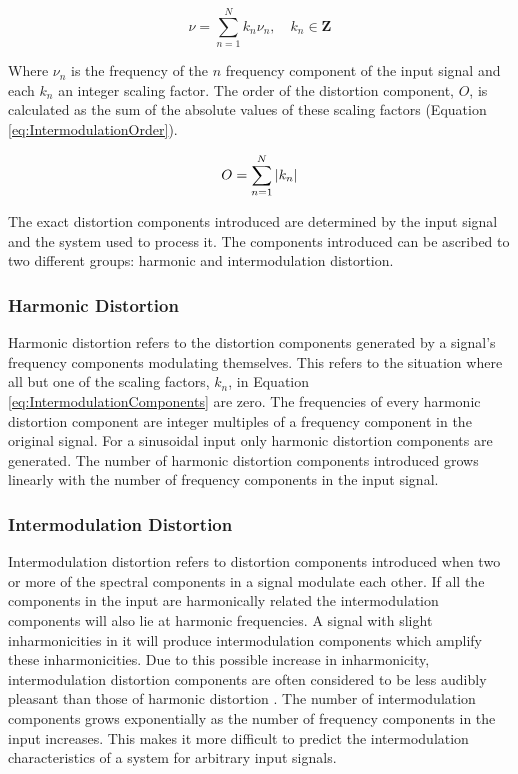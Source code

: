 		\begin{equation}
			\nu = \sum_{n = 1}^{N} k_{n}\nu_{n}, \quad k_{n} \in \textbf{Z}
			\label{eq:IntermodulationComponents}
		\end{equation}

		Where $\nu_{n}$ is the frequency of the $n$ frequency component of the input signal and each
		$k_{n}$ an integer scaling factor. The order of the distortion component, $O$, is calculated as the sum of
		the absolute values of these scaling factors (Equation \ref{eq:IntermodulationOrder}).

		\begin{equation}
			O = \sum_{n = 1}^{N} \left|k_{n}\right|
			\label{eq:IntermodulationOrder}
		\end{equation}

		The exact distortion components introduced are determined by the input signal and the system used to process
		it. The components introduced can be ascribed to two different groups: harmonic and intermodulation
		distortion.

		\subsubsection*{Harmonic Distortion}
			Harmonic distortion refers to the distortion components generated by a signal's frequency components
			modulating themselves. This refers to the situation where all but one of the scaling factors,
			$k_{n}$, in Equation \ref{eq:IntermodulationComponents} are zero. The frequencies of every harmonic
			distortion component are integer multiples of a frequency component in the original signal. For a
			sinusoidal input only harmonic distortion components are generated. The number of harmonic
			distortion components introduced grows linearly with the number of frequency components in the input
			signal.

		\subsubsection*{Intermodulation Distortion}
			Intermodulation distortion refers to distortion components introduced when two or more of the
			spectral components in a signal modulate each other. If all the components in the input are
			harmonically related the intermodulation components will also lie at harmonic frequencies. A signal
			with slight inharmonicities in it will produce intermodulation components which amplify these
			inharmonicities. Due to this possible increase in inharmonicity, intermodulation distortion
			components are often considered to be less audibly pleasant than those of harmonic distortion
			\citep{rumsey2009sound}. The number of intermodulation components grows exponentially as the number
			of frequency components in the input increases. This makes it more difficult to predict the
			intermodulation characteristics of a system for arbitrary input signals.

